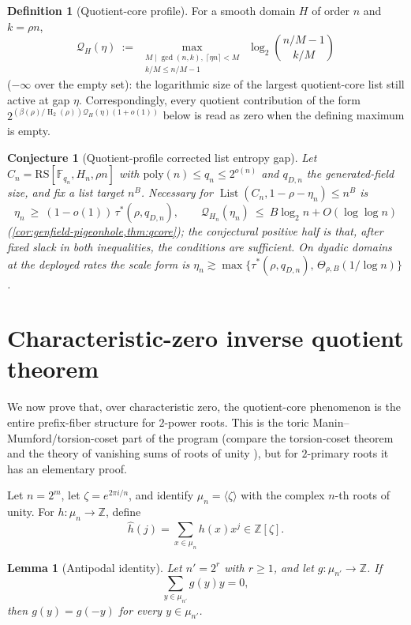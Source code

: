 \documentclass[11pt]{article}
\newtheorem{lemma}[lemma]{Lemma}
\newtheorem{conjecture}[conjecture]{Conjecture}
\theoremstyle{definition}
\newtheorem{definition}[definition]{Definition}
\newcommand{\F}{\mathbb F}
\newcommand{\Z}{\mathbb Z}
\newcommand{\HH}{\operatorname{H}_2}
\newcommand{\RS}{\mathrm{RS}}
\newcommand{\Lst}{\operatorname{List}}
\newcommand{\taustar}{\tau^{*}}
\begin{document}
\begin{definition}[Quotient-core profile]\label{def:qprofile}
For a smooth domain $H$ of order $n$ and $k=\rho n$,
\[
        \mathcal Q_H(\eta)\ :=\ \max_{\substack{M\mid\gcd(n,k),\ \lceil\eta n\rceil<M\\ k/M\le n/M-1}}\ \log_2\binom{n/M-1}{k/M}
\]
($-\infty$ over the empty set): the logarithmic size of the largest quotient-core list still active at gap $\eta$.  Correspondingly, every quotient contribution of the form $2^{(\beta(\rho)/\HH(\rho))\mathcal Q_H(\eta)(1+o(1))}$ below is read as zero when the defining maximum is empty.
\end{definition}

\begin{conjecture}[Quotient-profile corrected list entropy gap]\label{conj:listprofile}
Let $C_n=\RS[\F_{q_n},H_n,\rho n]$ with $\mathrm{poly}(n)\le q_n\le2^{o(n)}$ and $q_{D,n}$ the generated-field size, and fix a list target $n^B$.  Necessary for $\Lst(C_n,1-\rho-\eta_n)\le n^B$ is
\[
        \eta_n\ \ge\ (1-o(1))\,\taustar(\rho,q_{D,n}),
        \qquad
        \mathcal Q_{H_n}(\eta_n)\ \le\ B\log_2n+O(\log\log n)
\]
(\cref{cor:genfield-pigeonhole,thm:qcore}); the conjectural positive half is that, after fixed slack in both inequalities, the conditions are sufficient.  On dyadic domains at the deployed rates the scale form is $\eta_n\gtrsim\max\{\taustar(\rho,q_{D,n}),\,\Theta_{\rho,B}(1/\log n)\}$.
\end{conjecture}

\section{Characteristic-zero inverse quotient theorem}\label{sec:upstairs}

We now prove that, over characteristic zero, the quotient-core phenomenon is the entire prefix-fiber structure for $2$-power roots.  This is the toric Manin--Mumford/torsion-coset part of the program (compare the torsion-coset theorem \cite{Laurent84} and the theory of vanishing sums of roots of unity \cite{CJ76,LL00}), but for $2$-primary roots it has an elementary proof.

Let $n=2^m$, let $\zeta=e^{2\pi i/n}$, and identify $\mu_n=\langle\zeta\rangle$ with the complex $n$-th roots of unity.  For $h:\mu_n\to\Z$, define
\[
        \widehat h(j)=\sum_{x\in\mu_n}h(x)x^j\in\Z[\zeta].
\]

\begin{lemma}[Antipodal identity]\label{lem:antipodal}
Let $n'=2^r$ with $r\ge1$, and let $g:\mu_{n'}\to\Z$.  If
\[
        \sum_{y\in\mu_{n'}}g(y)y=0,
\]
then $g(y)=g(-y)$ for every $y\in\mu_{n'}$.
\end{lemma}
\end{document}
